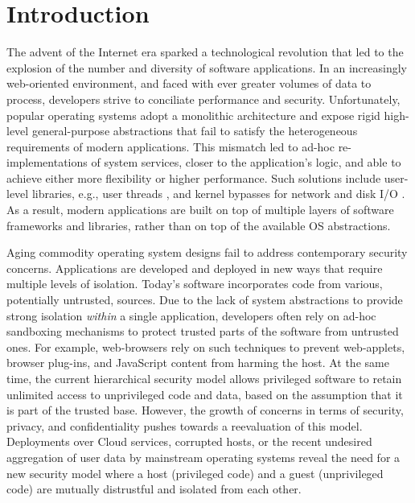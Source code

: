 \section{Introduction}

The advent of the Internet era sparked a technological revolution that led to the explosion of the number and diversity of software applications.
In an increasingly web-oriented environment, and faced with ever greater volumes of data to process, developers strive to conciliate performance and security.
Unfortunately, popular operating systems adopt a monolithic architecture and expose rigid high-level general-purpose abstractions that fail to satisfy the heterogeneous requirements of modern applications.
This mismatch led to ad-hoc re-implementations of system services, closer to the application's logic, and able to achieve either more flexibility or higher performance.
Such solutions include user-level libraries, e.g., user threads \cite{golang}, and kernel bypasses for network and disk I/O \cite{DBLP:conf/nsdi/NanavatiWW17,intel2014data,intel2016storage,BelayPKGKB14}.
As a result, modern applications are built on top of multiple layers of software frameworks and libraries, rather than on top of the available OS abstractions.

Aging commodity operating system designs fail to address contemporary security concerns.
Applications are developed and deployed in new ways that require multiple levels of isolation.
Today's software incorporates code from various, potentially untrusted, sources.
Due to the lack of system abstractions to provide strong isolation \emph{within} a single application, developers often rely on ad-hoc sandboxing mechanisms to protect trusted parts of the software from untrusted ones.
For example, web-browsers rely on such techniques to prevent web-applets, browser plug-ins, and JavaScript content from harming the host.
At the same time, the current hierarchical security model allows privileged software to retain unlimited access to unprivileged code and data, based on the assumption that it is part of the trusted base.
However, the growth of concerns in terms of security, privacy, and confidentiality pushes towards a reevaluation of this model.
Deployments over Cloud services, corrupted hosts, or the recent undesired aggregation of user data by mainstream operating systems \cite{microsoftspy} reveal the need for a new security model where a host (privileged code) and a guest (unprivileged code) are mutually distrustful and isolated from each other.

